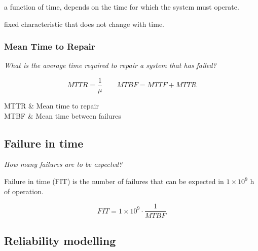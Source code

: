\documentclass[
  10pt,
  a4paper,
  twocolumn]{article}
\makeatletter
\providecommand{\tightlist}{%
  \setlength{\itemsep}{0pt}\setlength{\parskip}{0pt}}\usepackage{longtable,booktabs,array}
\newenvironment{conditions*}
  {\par\vspace{\abovedisplayskip}\noindent
   \tabularx{\columnwidth}{>{$}l<{$} @{${}:{}$} >{\raggedright\arraybackslash}X}}
  {\endtabularx\par\vspace{\belowdisplayskip}}
\makeatother
\begin{document}
\begin{tcolorbox}[enhanced jigsaw, toprule=.15mm, opacityback=0, colbacktitle=quarto-callout-important-color!10!white, breakable, colframe=quarto-callout-important-color-frame, title=\textcolor{quarto-callout-important-color}{\faExclamation}\hspace{0.5em}{Reliability vs.~MTTF}, left=2mm, arc=.35mm, toptitle=1mm, bottomrule=.15mm, rightrule=.15mm, titlerule=0mm, bottomtitle=1mm, leftrule=.75mm, opacitybacktitle=0.6, coltitle=black, colback=white]

\begin{description}
\tightlist
\item[Reliability]
a function of time, depends on the time for which the system must
operate.
\item[MTTF]
fixed characteristic that does not change with time.
\end{description}

\end{tcolorbox}

\subsubsection{Mean Time to Repair}\label{mean-time-to-repair}

\vspace{-2mm}{\color{Orchid}\faQuestionCircle[regular]} \emph{What is
the average time required to repair a system that has failed?}

\[
MTTR=\frac{1}{\mu}\qquad MTBF=MTTF + MTTR
\]

\begin{conditions*}
  MTTR & Mean time to repair\\
  MTBF & Mean time between failures
\end{conditions*}

\subsection{Failure in time}\label{failure-in-time}

\vspace{-2mm}{\color{Orchid}\faQuestionCircle[regular]} \emph{How many
failures are to be expected?}

Failure in time (FIT) is the number of failures that can be expected in
\(1\times 10^9\) h of operation.

\[
FIT = 1\times 10^9\cdot\frac{1}{MTBF}
\]

\subsection{Reliability modelling}\label{reliability-modelling}
\end{document}
